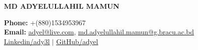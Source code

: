 \documentclass[A4,11pt]{article}
\begin{document}


\begin{center}
   \textbf{\Huge \scshape MD ADYELULLAHIL MAMUN} \\ \vspace{1pt} %

    \textbf{Phone: }\small +(880)1534953967  \\
    
    \textbf{Email: }
    \href{mailto:adyel@live.com}{adyel@live.com}, 
    \href{mailto:md.adyelullahil.mamun@g.bracu.ac.bd}{md.adyelullahil.mamun@g.bracu.ac.bd}    \\
    
   \href{https://www.linkedin.com/in/ady3l/}{\underline{Linkedin/ady3l}} $|$
   \href{https://github.com/adyel}{\underline{GitHub/adyel}}
\end{center}
\end{document}
